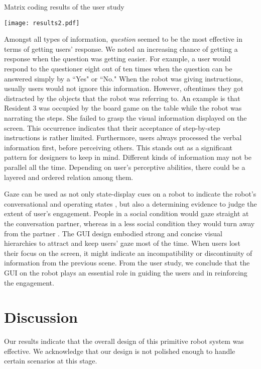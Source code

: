 \documentclass[letterpaper, 10 pt, conference]{ieeeconf}  %
\begin{document}
\begin{table}[hbt]
\centering
\caption{Matrix coding results of the user study}
\texttt{[image: results2.pdf]}
\label{tbl:results2}
\end{table}

Amongst all types of information, \textit{question} seemed to be the most effective in terms of getting users' response. We noted an increasing chance of getting a response when the question was getting easier. For example, a user would respond to the questioner eight out of ten times when the question can be answered simply by a ``Yes" or ``No." When the robot was giving instructions, usually users would not ignore this information. However, oftentimes they got distracted by the objects that the robot was referring to. An example is that Resident 3 was occupied by the board game on the table while the robot was narrating the steps. She failed to grasp the visual information displayed on the screen. This occurrence indicates that their acceptance of step-by-step instructions is rather limited. Furthermore, users always processed the verbal information first, before perceiving others. This stands out as a significant pattern for designers to keep in mind. Different kinds of information may not be parallel all the time. Depending on user's perceptive abilities, there could be a layered and ordered relation among them. 

Gaze can be used as not only state-display cues on a robot to indicate the robot's conversational and operating states \cite{Breazeal2008}, but also a determining evidence to judge the extent of user's engagement. People in a social condition would gaze straight at the conversation partner, whereas in a less social condition they would turn away from the partner \cite{Heerink2009}. The GUI design embodied strong and concise visual hierarchies to attract and keep users' gaze most of the time. When users lost their focus on the screen, it might indicate an incompatibility or discontinuity of information from the previous scene. From the user study, we conclude that the GUI on the robot plays an essential role in guiding the users and in reinforcing the engagement.


\section{Discussion}

Our results indicate that the overall design of this primitive robot system was effective. We acknowledge that our design is not polished enough to handle certain scenarios at this stage. 
\end{document}
